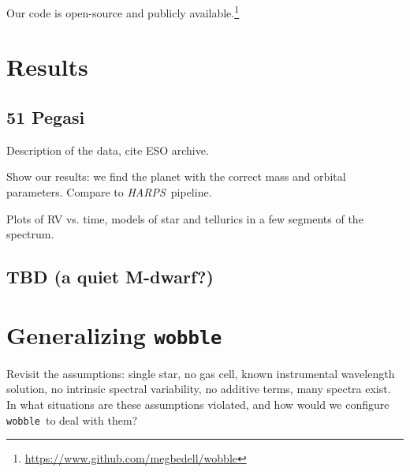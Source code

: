 \documentclass[twocolumn]{aastex62}
\newcommand{\acronym}[1]{{\small{#1}}}
\newcommand{\project}[1]{\textsl{#1}}
\newcommand{\code}[1]{\texttt{#1}}
\newcommand{\HARPS}{\project{\acronym{HARPS}}}
\newcommand{\wobble}{\code{wobble}}
\begin{document}
Our code is open-source and publicly available.\footnote{\url{https://www.github.com/megbedell/wobble}}


\section{Results}
\label{s:results}
\subsection{51 Pegasi}

Description of the data, cite \acronym{ESO} archive.

Show our results: we find the planet with the correct mass and orbital parameters. Compare to \HARPS\ pipeline.

Plots of RV vs. time, models of star and tellurics in a few segments of the spectrum.

\subsection{TBD (a quiet M-dwarf?)}

\section{Generalizing \wobble}
\label{s:future}

Revisit the assumptions: single star, no gas cell, known instrumental wavelength solution, no intrinsic spectral variability, no additive terms, many spectra exist. 
In what situations are these assumptions violated, and how would we configure \wobble\ to deal with them?


\end{document}
